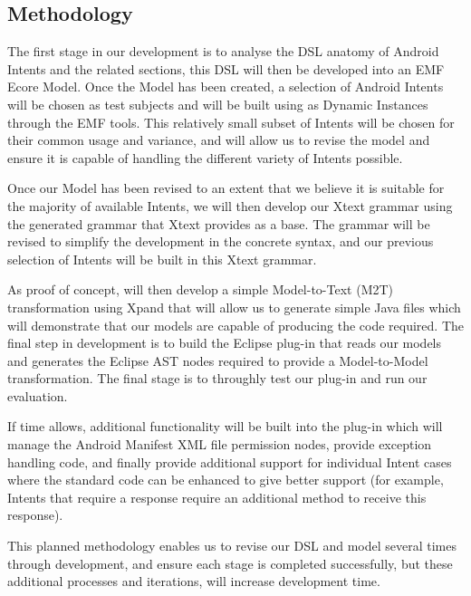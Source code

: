 \subsection{Methodology}
The first stage in our development is to analyse the DSL anatomy of Android Intents and the related sections, this DSL will then be developed into an EMF Ecore Model. Once the Model has been created, a selection of Android Intents will be chosen as test subjects and will be built using as Dynamic Instances through the EMF tools. This relatively small subset of Intents will be chosen for their common usage and variance, and will allow us to revise the model and ensure it is capable of handling the different variety of Intents possible.

Once our Model has been revised to an extent that we believe it is suitable for the majority of available Intents, we will then develop our Xtext grammar using the generated grammar that Xtext provides as a base. The grammar will be revised to simplify the development in the concrete syntax, and our previous selection of Intents will be built in this Xtext grammar.

As proof of concept, will then develop a simple Model-to-Text (M2T) transformation using Xpand that will allow us to generate simple Java files which will demonstrate that our models are capable of producing the code required. The final step in development is to build the Eclipse plug-in that reads our models and generates the Eclipse AST nodes required to provide a Model-to-Model transformation. The final stage is to throughly test our plug-in and run our evaluation.

If time allows, additional functionality will be built into the plug-in which will manage the Android Manifest XML file permission nodes, provide exception handling code, and finally provide additional support for individual Intent cases where the standard code can be enhanced to give better support (for example, Intents that require a response require an additional method to receive this response).

This planned methodology enables us to revise our DSL and model several times through development, and ensure each stage is completed successfully, but these additional processes and iterations, will increase development time.
